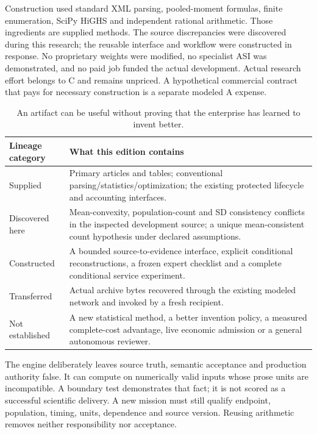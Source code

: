 Construction used standard XML parsing, pooled-moment formulas, finite enumeration, SciPy HiGHS and independent rational arithmetic. Those ingredients are supplied methods. The source discrepancies were discovered during this research; the reusable interface and workflow were constructed in response. No proprietary weights were modified, no specialist ASI was demonstrated, and no paid job funded the actual development. Actual research effort belongs to C and remains unpriced. A hypothetical commercial contract that pays for necessary construction is a separate modeled A expense.

\begin{table}[htbp]\centering\small
\begin{tabularx}{\textwidth}{p{}Y}
\toprule Lineage category & What this edition contains\\\midrule
Supplied & Primary articles and tables; conventional parsing/statistics/optimization; the existing protected lifecycle and accounting interfaces.\\
Discovered here & Mean-convexity, population-count and SD consistency conflicts in the inspected development source; a unique mean-consistent count hypothesis under declared assumptions.\\
Constructed & A bounded source-to-evidence interface, explicit conditional reconstructions, a frozen expert checklist and a complete conditional service experiment.\\
Transferred & Actual archive bytes recovered through the existing modeled network and invoked by a fresh recipient.\\
Not established & A new statistical method, a better invention policy, a measured complete-cost advantage, live economic admission or a general autonomous reviewer.\\\bottomrule
\end{tabularx}
\caption{An artifact can be useful without proving that the enterprise has learned to invent better.}
\end{table}

The engine deliberately leaves source truth, semantic acceptance and production authority false. It can compute on numerically valid inputs whose prose units are incompatible. A boundary test demonstrates that fact; it is not scored as a successful scientific delivery. A new mission must still qualify endpoint, population, timing, units, dependence and source version. Reusing arithmetic removes neither responsibility nor acceptance.

